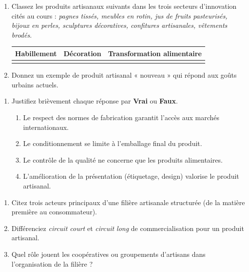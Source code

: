 \documentclass[11pt]{article}
\begin{document}
\begin{exercice}
\begin{enumerate}
    \item Classez les produits artisanaux suivants dans les trois secteurs d'innovation cités au cours : \textit{pagnes tissés, meubles en rotin, jus de fruits pasteurisés, bijoux en perles, sculptures décoratives, confitures artisanales, vêtements brodés}.
    
    \begin{tabular}{|l|l|l|}
    \hline
    \textbf{Habillement} & \textbf{Décoration} & \textbf{Transformation alimentaire} \\
    \hline
     &  &  \\
    \hline
    \end{tabular}
    
    \item Donnez un exemple de produit artisanal « nouveau » qui répond aux goûts urbains actuels.
\end{enumerate}
\end{exercice}

\begin{exercice}
\begin{enumerate}
    \item Justifiez brièvement chaque réponse par \textbf{Vrai} ou \textbf{Faux}.
    \begin{enumerate}
        \item Le respect des normes de fabrication garantit l'accès aux marchés internationaux.
        \item Le conditionnement se limite à l'emballage final du produit.
        \item Le contrôle de la qualité ne concerne que les produits alimentaires.
        \item L'amélioration de la présentation (étiquetage, design) valorise le produit artisanal.
    \end{enumerate}
\end{enumerate}
\end{exercice}

\begin{exercice}
\begin{enumerate}
    \item Citez trois acteurs principaux d'une filière artisanale structurée (de la matière première au consommateur).
    \item Différenciez \textit{circuit court} et \textit{circuit long} de commercialisation pour un produit artisanal.
    \item Quel rôle jouent les coopératives ou groupements d'artisans dans l'organisation de la filière ?
\end{enumerate}
\end{exercice}
\end{document}
